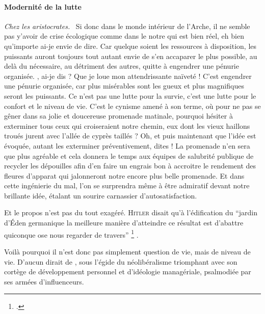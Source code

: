 \paragraph{Modernité de la lutte}
{\em\normalsize Chez les aristocrates.}~
Si donc dans le monde intérieur de l’Arche, il ne semble pas y’avoir de crise écologique comme dans le notre qui est bien réel, eh bien qu’importe ai-je envie de dire. Car quelque soient les ressources à disposition, les puissants auront toujours tout autant envie de s’en accaparer le plus possible, au delà du nécessaire, au détriment des autres, quitte à engendrer une pénurie organisée. , ai-je dis ? Que je loue mon attendrissante naïveté ! C’est  engendrer une pénurie organisée, car plus misérables sont les gueux et plus magnifiques seront les puissants.
Ce n’est pas une lutte pour la survie, c’est une lutte pour le confort et le niveau de vie. %
C’est le cynisme amené à son terme, où pour ne pas se gêner dans sa jolie et doucereuse promenade matinale, pourquoi hésiter à exterminer tous ceux qui croiseraient notre chemin, eux dont les vieux haillons troués jurent avec l’allée de cyprès taillés ? Oh, et puis maintenant que l’idée est évoquée, autant les exterminer préventivement, dites ! La promenade n’en sera que plus agréable et cela donnera le temps aux équipes de salubrité publique de recycler les dépouilles afin d’en faire un engrais bon à accroitre le rendement des fleures d’apparat qui jalonneront notre encore plus belle promenade. Et dans cette ingénierie du mal, l’on se surprendra même à être admiratif devant notre brillante idée, étalant un sourire carnassier d’autosatisfaction.

Et le propos n’est pas du tout exagéré. \textsc{Hitler} disait qu’à l’édification du \enquote{jardin d’Éden germanique \textelp{} la meilleure manière d’atteindre ce résultat est d’abattre quiconque ose nous regarder de travers}%
\footcite[La citation est tirée des notes de \textsc{Bormann}, présentées en tant que preuve lors du procès de Nuremberg.][]{chirstopherBrowning2022BellesLettres-politiqueNazieTravailleursJuifsBourreauxAllemands}%
.

Voilà pourquoi il n’est donc pas simplement question de vie, mais de niveau de vie. D’aucun dirait de , sous l’égide du néolibéralisme triomphant avec son cortège de développement personnel et d’idéologie managériale, psalmodiée par ses armées d’influenceurs.

